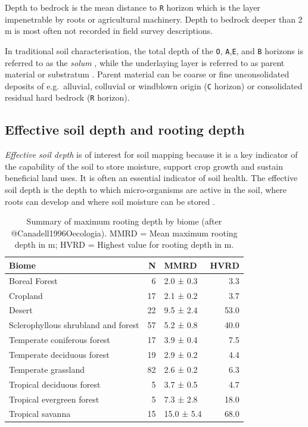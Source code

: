 \documentclass[11pt]{krantz}
\makeatletter
\newenvironment{kframe}{%
\medskip{}
\setlength{\fboxsep}{.8em}
 \def\at@end@of@kframe{}%
 \ifinner\ifhmode%
  \def\at@end@of@kframe{\end{minipage}}%
  \begin{minipage}{\columnwidth}%
 \fi\fi%
 \def\FrameCommand##1{\hskip\@totalleftmargin \hskip-\fboxsep
 \colorbox{shadecolor}{##1}\hskip-\fboxsep
     \hskip-\linewidth \hskip-\@totalleftmargin \hskip\columnwidth}%
 \MakeFramed {\advance\hsize-\width
   \@totalleftmargin\z@ \linewidth\hsize
   \@setminipage}}%
 {\par\unskip\endMakeFramed%
 \at@end@of@kframe}
\newenvironment{rmdblock}[1]
  {
  \begin{itemize}
  \renewcommand{\labelitemi}{
    \raisebox{-.7\height}[0pt][0pt]{
      {\setkeys{Gin}{width=3em,keepaspectratio}\texttt{[image: images/\#1]}}
    }
  }
  \setlength{\fboxsep}{1em}
  \begin{kframe}
  \item
  }
  {
  \end{kframe}
  \end{itemize}
  }
\newenvironment{rmdnote}
  {\begin{rmdblock}{note}}
  {\end{rmdblock}}
\theoremstyle{definition}
\theoremstyle{definition}
\theoremstyle{definition}
\theoremstyle{remark}
\makeatother
\begin{document}
\begin{rmdnote}
Depth to bedrock is the mean distance to \texttt{R} horizon which is the
layer impenetrable by roots or agricultural machinery. Depth to bedrock
deeper than 2 m is most often not recorded in field survey descriptions.
\end{rmdnote}

In traditional soil characterisation, the total depth of the \texttt{O},
\texttt{A},\texttt{E}, and \texttt{B} horizons is referred to as the
\emph{solum} \citep{harpstead2001soil}, while the underlaying layer is
referred to as parent material or substratum \citep{SSDS1993}. Parent
material can be coarse or fine unconsolidated deposits of e.g.~alluvial,
colluvial or windblown origin (\texttt{C} horizon) or consolidated
residual hard bedrock (\texttt{R} horizon).

\hypertarget{effective-soil-depth-and-rooting-depth}{%
\subsection{Effective soil depth and rooting
depth}\label{effective-soil-depth-and-rooting-depth}}

\emph{Effective soil depth} is of interest for soil mapping because it
is a key indicator of the capability of the soil to store moisture,
support crop growth and sustain beneficial land uses. It is often an
essential indicator of soil health. The effective soil depth is the
depth to which micro-organisms are active in the soil, where roots can
develop and where soil moisture can be stored \citep{FAO2006}.

\begin{table}

\caption{\label{tab:rootingdepths}Summary of maximum rooting depth by biome (after @Canadell1996Oecologia). MMRD = Mean maximum rooting depth in m; HVRD = Highest value for rooting depth in m.}
\centering
\begin{tabular}[t]{lrlr}
\toprule
Biome & N & MMRD & HVRD\\
\midrule
Boreal Forest & 6 & 2.0 ± 0.3 & 3.3\\
Cropland & 17 & 2.1 ± 0.2 & 3.7\\
Desert & 22 & 9.5 ± 2.4 & 53.0\\
Sclerophyllous shrubland and forest & 57 & 5.2 ± 0.8 & 40.0\\
Temperate coniferous forest & 17 & 3.9 ± 0.4 & 7.5\\
\addlinespace
Temperate deciduous forest & 19 & 2.9 ± 0.2 & 4.4\\
Temperate grassland & 82 & 2.6 ± 0.2 & 6.3\\
Tropical deciduous forest & 5 & 3.7 ± 0.5 & 4.7\\
Tropical evergreen forest & 5 & 7.3 ± 2.8 & 18.0\\
Tropical savanna & 15 & 15.0 ± 5.4 & 68.0\\
\bottomrule
\end{tabular}
\end{table}
\end{document}
